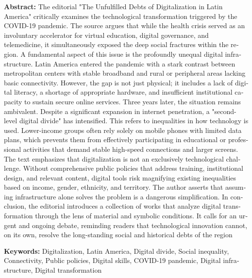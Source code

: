 \begin{tcolorbox}[colback=brown!8!white,colframe=brown!8!white,boxrule=0pt,arc=2pt,left=4pt,right=4pt,top=3pt,bottom=3pt,before skip=4pt,after skip=4pt]
\begin{otherlanguage}{english}
\sffamily\small \textbf{Abstract:} The editorial "The Unfulfilled Debts of Digitalization in Latin America" critically examines the technological transformation triggered by the COVID-19 pandemic. The source argues that while the health crisis served as an involuntary accelerator for virtual education, digital governance, and telemedicine, it simultaneously exposed the deep social fractures within the region.
A fundamental aspect of this issue is the profoundly unequal digital infrastructure. Latin America entered the pandemic with a stark contrast between metropolitan centers with stable broadband and rural or peripheral areas lacking basic connectivity. However, the gap is not just physical; it includes a lack of digital literacy, a shortage of appropriate hardware, and insufficient institutional capacity to sustain secure online services.
Three years later, the situation remains ambivalent. Despite a significant expansion in internet penetration, a "second-level digital divide" has intensified. This refers to inequalities in how technology is used. Lower-income groups often rely solely on mobile phones with limited data plans, which prevents them from effectively participating in educational or professional activities that demand stable high-speed connections and larger screens.
The text emphasizes that digitalization is not an exclusively technological challenge. Without comprehensive public policies that address training, institutional design, and relevant content, digital tools risk magnifying existing inequalities based on income, gender, ethnicity, and territory. The author asserts that assuming infrastructure alone solves the problem is a dangerous simplification.
In conclusion, the editorial introduces a collection of works that analyze digital transformation through the lens of material and symbolic conditions. It calls for an urgent and ongoing debate, reminding readers that technological innovation cannot, on its own, resolve the long-standing social and historical debts of the region
\par\smallskip\noindent\textbf{Keywords:} Digitalization, Latin America, Digital divide, Social inequality, Connectivity, Public policies, Digital skills, COVID-19 pandemic, Digital infrastructure, Digital transformation
\end{otherlanguage}
\end{tcolorbox}

